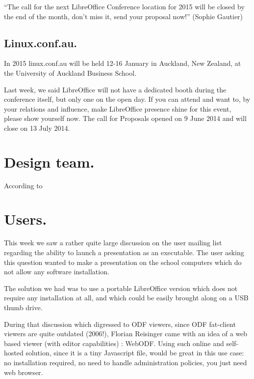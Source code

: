 \documentclass{article}
\begin{document}
``The call for the next LibreOffice Conference location for 2015 will be
closed by the end of the month, don't miss it, send your proposal now!'' (Sophie Gautier) \cite{liboConf2015}

\subsection{Linux.conf.au.}

In 2015 linux.conf.au will be held 12-16 January in Auckland, New Zealand, at
the University of Auckland Business School. 

Last week, we said LibreOffice will not have a dedicated booth during the conference itself, but only one on the open day\cite{linuxConfAuckland2}. If you can attend and want to, by your relations and influence, make LibreOffice presence shine for this event, please show yourself now. The call for Proposals opened on 9 June 2014 and will close on 13 July 2014\cite{linuxConfAuckland1}. 



\section{Design team.}

According to 



\section{Users.}

This week we saw a rather quite large discussion on the user mailing list regarding the ability to launch a presentation as an executable. The user asking this question wanted to make a presentation on the school computers which do not allow any software installation.

The solution we had was to use a portable LibreOffice version\cite{liboPortable} which does not require any installation at all, and which could be easily brought along on a USB thumb drive.

During that discussion which digressed to ODF viewers, since ODF fat-client\cite{fatClient} viewers\cite{odfViewers} are quite outdated (2006!)\cite{odfViewersOutdated}, Florian Reisinger came with an idea of a web based viewer (with editor capabilities) : WebODF. Using such online and self-hosted solution, since it is a tiny Javascript file, would be great in this use case: no installation required, no need to handle administration policies, you just need web browser.
\end{document}
